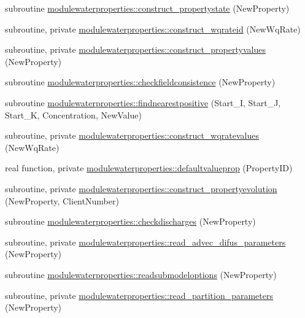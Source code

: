 \begin{DoxyCompactItemize}
\item 
subroutine \mbox{\hyperlink{namespacemodulewaterproperties_ae8c62a5189e434530eafcfe1fe66dae4}{modulewaterproperties\+::construct\+\_\+propertystate}} (New\+Property)
\item 
subroutine, private \mbox{\hyperlink{namespacemodulewaterproperties_ab6c7c187dc0a1da19d043a98bcdde9ec}{modulewaterproperties\+::construct\+\_\+wqrateid}} (New\+Wq\+Rate)
\item 
subroutine, private \mbox{\hyperlink{namespacemodulewaterproperties_aa646aa8763204437f6ad88ddbd01c560}{modulewaterproperties\+::construct\+\_\+propertyvalues}} (New\+Property)
\item 
subroutine \mbox{\hyperlink{namespacemodulewaterproperties_ae1f665f653d3f72ef388bbb889ec57c9}{modulewaterproperties\+::checkfieldconsistence}} (New\+Property)
\item 
subroutine \mbox{\hyperlink{namespacemodulewaterproperties_a9af27763ee733163a23f71ee92aafb09}{modulewaterproperties\+::findnearestpositive}} (Start\+\_\+I, Start\+\_\+J, Start\+\_\+K, Concentration, New\+Value)
\item 
subroutine, private \mbox{\hyperlink{namespacemodulewaterproperties_ad23f7574f0a024c14e1ef11aeadb52ab}{modulewaterproperties\+::construct\+\_\+wqratevalues}} (New\+Wq\+Rate)
\item 
real function, private \mbox{\hyperlink{namespacemodulewaterproperties_a3a9b963326300338acf15af3b6edcdae}{modulewaterproperties\+::defaultvalueprop}} (Property\+ID)
\item 
subroutine, private \mbox{\hyperlink{namespacemodulewaterproperties_ac9ab6b0f5ee3c2470edaceaf1ef669a7}{modulewaterproperties\+::construct\+\_\+propertyevolution}} (New\+Property, Client\+Number)
\item 
subroutine \mbox{\hyperlink{namespacemodulewaterproperties_a3d45e3e4c8782ebce340659d7f000fbb}{modulewaterproperties\+::checkdischarges}} (New\+Property)
\item 
subroutine, private \mbox{\hyperlink{namespacemodulewaterproperties_a178c0df0a5c46c1d129d7dfd6e6982fc}{modulewaterproperties\+::read\+\_\+advec\+\_\+difus\+\_\+parameters}} (New\+Property)
\item 
subroutine \mbox{\hyperlink{namespacemodulewaterproperties_a5a214d6f2f108bf67d3db3df4165609d}{modulewaterproperties\+::readsubmodeloptions}} (New\+Property)
\item 
subroutine, private \mbox{\hyperlink{namespacemodulewaterproperties_ac511e23eb2975f0a46fef2973712f060}{modulewaterproperties\+::read\+\_\+partition\+\_\+parameters}} (New\+Property)

\end{DoxyCompactItemize}
